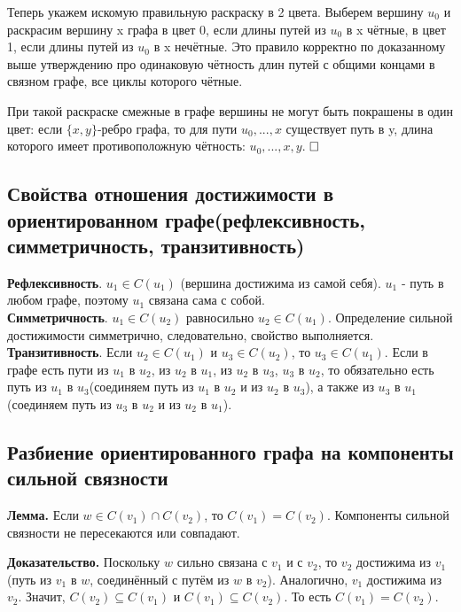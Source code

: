 \documentclass[a4paper, 10pt]{article}
\begin{document}
Теперь укажем искомую правильную раскраску в 2 цвета. Выберем вершину $u_0$ и раскрасим вершину x графа в цвет 0, если длины путей из $u_0$ в x чётные, в цвет 1, если длины путей из $u_0$ в x нечётные. Это правило корректно по доказанному выше утверждению про одинаковую чётность длин путей с общими концами в связном графе, все циклы которого чётные.

При такой раскраске смежные в графе вершины не могут быть покрашены в один цвет: если $\{x, y\}$-ребро графа, то для пути $u_0, ..., x$ существует путь в y, длина которого имеет противоположную чётность: $u_0, ..., x, y$. $\hfill \square$




\subsection{Свойства отношения достижимости в ориентированном графе(рефлексивность, симметричность, транзитивность)}



\textbf{Рефлексивность}. $u_1 \in C(u_1)$ (вершина достижима из самой себя). $u_1$ - путь в любом графе, поэтому $u_1$ связана сама с собой. \\

\textbf{Симметричность}. $u_1 \in C(u_2)$ равносильно $u_2 \in C(u_1)$. Определение сильной достижимости симметрично, следовательно, свойство выполняется. \\

\textbf{Транзитивность}. Если $u_2 \in C(u_1)$ и $u_3 \in C(u_2)$, то $u_3 \in C(u_1)$. Если в графе есть пути из $u_1$ в $u_2$, из $u_2$ в $u_1$, из $u_2$ в $u_3$, $u_3$ в $u_2$, то обязательно есть путь из $u_1$ в $u_3$(соединяем путь из $u_1$ в $u_2$ и из $u_2$ в $u_3$), а также из $u_3$ в $u_1$(соединяем путь из $u_3$ в $u_2$ и из $u_2$ в $u_1$).



\subsection{Разбиение ориентированного графа на компоненты сильной связности}

\textbf{Лемма.} Если $w \in C(v_1) \cap C(v_2)$, то $C(v_1) = C(v_2)$. Компоненты сильной связности не пересекаются или совпадают.


\medskip

\textbf{Доказательство.} Поскольку $w$ сильно связана с $v_1$ и с $v_2$, то $v_2$ достижима из $v_1$ (путь из $v_1$ в $w$, соединённый с путём из $w$ в $v_2$). Аналогично, $v_1$ достижима из $v_2$.
Значит, $C(v_2) \subseteq C(v_1)$ и $C(v_1) \subseteq C(v_2)$. То есть $C(v_1) = C(v_2)$.
\end{document}

